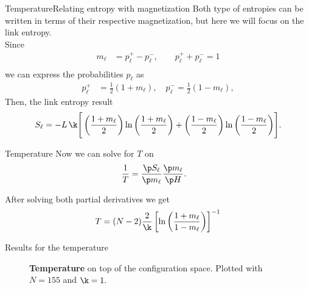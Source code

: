 \begin{frame}{Temperature}{Relating entropy with magnetization}
Both type of  entropies can be written in terms of their respective magnetization, but here we will focus on the link entropy.\\[1em]

Since
\begin{align*}
	m_\ell &= p_{\ell}^{+} - p_{\ell}^{-},\qquad  p_{\ell}^{+} + p_{\ell}^{-} = 1\\
\end{align*}
we can express the probabilities $p_{\ell}$ as
\begin{align*}
    p_\ell^{+} &= \frac{1}{2}(1+m_\ell), \quad p_\ell^{-} = \frac{1}{2}(1-m_\ell),%
\end{align*}
Then, the link entropy result
\begin{equation}
        S_\ell = - L\,\k \Biggr[\left(\frac{1+m_\ell}{2}\right) \ln\left(\frac{1+m_\ell}{2}\right) + \left(\frac{1-m_\ell}{2}\right)\ln \left(\frac{1-m_\ell}{2}\right)\Biggr]\label{eq:Sl_m}.
\end{equation}
\end{frame}

\begin{frame}{Temperature}
Now we can solve for $T$ on 
\begin{align*}
    \frac{1}{T} &= \frac{\p S_\ell}{\p m_\ell} \frac{\p m_\ell}{\p H}.
\end{align*}

After solving both partial derivatives we get 
\begin{equation}
	T = (N-2)\frac{2}{\k}\left[\ln \left(\frac{1+m_\ell}{1-m_\ell}\right) \right]^{-1}\label{eq:T_final}
\end{equation}

\end{frame}


\begin{frame}{Results for the temperature}
\vspace{-1mm}
\begin{figure}[h]
    \centering
	\vspace{-1mm}
    \caption{\textbf{Temperature} on top of the configuration space. Plotted with $N=155$ and $\k=1.$}
    \label{fig:Tps}
\end{figure}
\end{frame}


